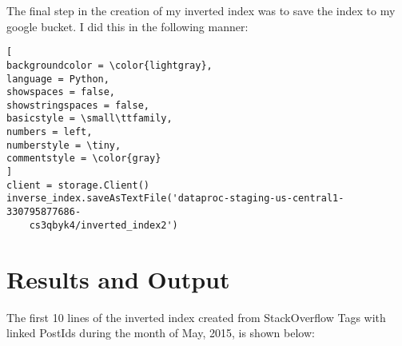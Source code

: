 \documentclass[]{article}
\begin{document}
The final step in the creation of my inverted index was to save the index to my google bucket.  I did this in the following manner:

\begin{lstlisting}[
backgroundcolor = \color{lightgray},
language = Python,
showspaces = false,
showstringspaces = false,
basicstyle = \small\ttfamily,
numbers = left,
numberstyle = \tiny,
commentstyle = \color{gray}
]
client = storage.Client()
inverse_index.saveAsTextFile('dataproc-staging-us-central1-330795877686-
	cs3qbyk4/inverted_index2')
\end{lstlisting}


\section{Results and Output}
The first 10 lines of the inverted index created from StackOverflow Tags with linked PostIds during the month of May, 2015, is shown below:
\end{document}
